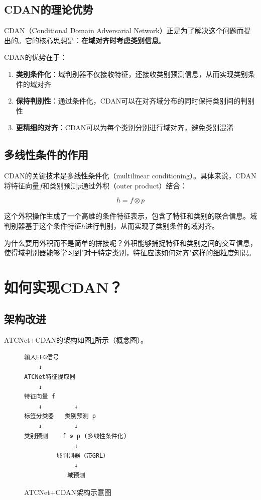 \documentclass[12pt,a4paper]{ctexart}
\begin{document}
\subsection{CDAN的理论优势}

CDAN（Conditional Domain Adversarial Network）正是为了解决这个问题而提出的。它的核心思想是：\textbf{在域对齐时考虑类别信息}。

CDAN的优势在于：

\begin{enumerate}
    \item \textbf{类别条件化}：域判别器不仅接收特征，还接收类别预测信息，从而实现类别条件的域对齐
    \item \textbf{保持判别性}：通过条件化，CDAN可以在对齐域分布的同时保持类别间的判别性
    \item \textbf{更精细的对齐}：CDAN可以为每个类别分别进行域对齐，避免类别混淆
\end{enumerate}

\subsection{多线性条件的作用}

CDAN的关键技术是多线性条件化（multilinear conditioning）。具体来说，CDAN将特征向量$f$和类别预测$p$通过外积（outer product）结合：

\begin{equation}
h = f \otimes p
\end{equation}

这个外积操作生成了一个高维的条件特征表示，包含了特征和类别的联合信息。域判别器基于这个条件特征$h$进行判别，从而实现了类别条件的域对齐。

为什么要用外积而不是简单的拼接呢？外积能够捕捉特征和类别之间的交互信息，使得域判别器能够学习到"对于特定类别，特征应该如何对齐"这样的细粒度知识。

\section{如何实现CDAN？}

\subsection{架构改进}

ATCNet+CDAN的架构如图\ref{fig:atcnet_cdan_arch}所示（概念图）。

\begin{figure}[H]
\centering
\begin{verbatim}
输入EEG信号
    ↓
ATCNet特征提取器
    ↓
特征向量 f
    ↓         ↓
标签分类器   类别预测 p
    ↓         ↓
类别预测    f ⊗ p (多线性条件化)
              ↓
         域判别器（带GRL）
              ↓
            域预测
\end{verbatim}
\caption{ATCNet+CDAN架构示意图}
\label{fig:atcnet_cdan_arch}
\end{figure}
\end{document}

